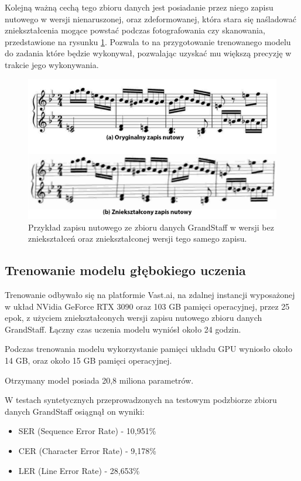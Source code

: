 Kolejną ważną cechą tego zbioru danych jest posiadanie przez niego zapisu nutowego w wersji nienaruszonej, oraz zdeformowanej, która stara się naśladować zniekształcenia mogące powstać podczas fotografowania czy skanowania, przedstawione na rysunku \ref{fig:GS-normal-distorted}. Pozwala to na przygotowanie trenowanego modelu do zadania które będzie wykonywał, pozwalając uzyskać mu większą precyzję w trakcie jego wykonywania.

\begin{figure}[htb]
	\centering
	\includegraphics[width=14cm]{images/normal-distorted-GS}
	\caption{Przykład zapisu nutowego ze zbioru danych GrandStaff w wersji bez zniekształceń oraz zniekształconej wersji tego samego zapisu.}
	\label{fig:GS-normal-distorted}
\end{figure}

\subsection{Trenowanie modelu głębokiego uczenia} \label{ModelTraining}

Trenowanie odbywało się na platformie Vast.ai, na zdalnej instancji wyposażonej w układ NVidia GeForce RTX 3090 oraz 103 GB pamięci operacyjnej, przez 25 epok, z użyciem zniekształconych wersji zapisu nutowego zbioru danych GrandStaff. Łączny czas uczenia modelu wyniósł około 24 godzin.

Podczas trenowania modelu wykorzystanie pamięci układu GPU wyniosło około 14 GB, oraz około 15 GB pamięci operacyjnej.

Otrzymany model posiada 20,8 miliona parametrów.

W testach syntetycznych przeprowadzonych na testowym podzbiorze zbioru danych GrandStaff osiągnął on wyniki:
\begin{itemize}
	\item SER (Sequence Error Rate) - 10,951\%
	\item CER (Character Error Rate) - 9,178\%
	\item LER (Line Error Rate) - 28,653\%
\end{itemize}

